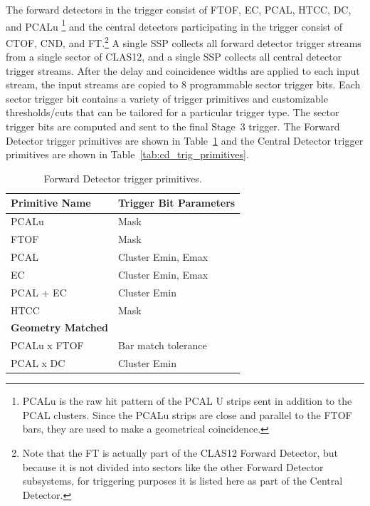 The forward detectors in the trigger consist of FTOF, EC, PCAL, HTCC, DC, and PCALu \footnote{PCALu is the
  raw hit pattern of the PCAL U strips sent in addition to the PCAL clusters. Since the PCALu strips are close
  and parallel to the FTOF bars, they are used to make a geometrical coincidence.} and the central detectors
participating in the trigger consist of CTOF, CND, and FT.\footnote{Note that the FT is actually part of the
  CLAS12 Forward Detector, but because it is not divided into sectors like the other Forward Detector
  subsystems, for triggering purposes it is listed here as part of the Central Detector.} A single SSP collects
all forward detector trigger streams from a single sector of CLAS12, and a single SSP collects all central
detector trigger streams. After the delay and coincidence widths are applied to each input stream, the input
streams are copied to 8 programmable sector trigger bits. Each sector trigger bit contains a variety of trigger
primitives and customizable thresholds/cuts that can be tailored for a particular trigger type. The sector
trigger bits are computed and sent to the final Stage~3 trigger. The Forward Detector trigger primitives are
shown in Table~\ref{tab:fd_trig_primitives} and the Central Detector trigger primitives are shown in
Table~\ref{tab:cd_trig_primitives}.

\begin{table}
\begin{center}
	\begin{tabular}{| l | l |}
		\hline \hline
		Primitive Name			& Trigger Bit Parameters	\\
		\hline
		PCALu     			& Mask				\\
		FTOF    			& Mask				\\
		PCAL				& Cluster Emin, Emax		\\
		EC 				& Cluster Emin, Emax		\\
		PCAL + EC			& Cluster Emin			\\
		HTCC				& Mask				\\
		{\bf Geometry Matched}		&				\\
		PCALu x FTOF			& Bar match tolerance		\\
		PCAL x DC				& Cluster Emin			\\
		\hline \hline
	\end{tabular}
\end{center}
\caption{Forward Detector trigger primitives.}
\label{tab:fd_trig_primitives}
\end{table}

